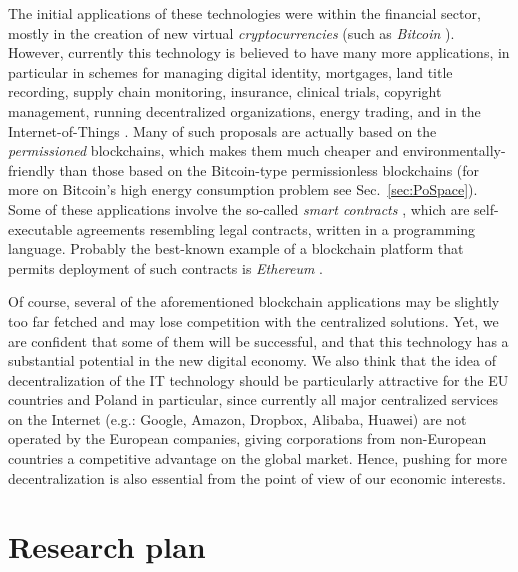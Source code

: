 \documentclass{article}
\begin{document}
The initial applications of these technologies were within the financial sector, mostly in the creation of new virtual \emph{cryptocurrencies} (such as \emph{Bitcoin} \cite{nakamoto2008bitcoin}). However, currently this technology is believed to have many more applications, in particular in schemes for managing digital identity, mortgages, land title recording, supply chain monitoring, insurance, 
clinical trials, copyright management, running decentralized organizations, energy trading, and in the Internet-of-Things \cite{econ3,forbes,econ2,Underwood:2016:BBB:3013530.2994581,EY,ibm,Microsoft5,DHL,chamber,capgemini,pwc,EY,DHL,iot,economist-dao,pwc2}. Many of such proposals are actually based on the \emph{permissioned} blockchains, which makes them much cheaper and environmentally-friendly than those based on the Bitcoin-type permissionless blockchains (for more on Bitcoin's high energy consumption problem see Sec.~\ref{sec:PoSpace}). Some of these applications involve the so-called \emph{smart contracts} \cite{Szabo}, which are self-executable agreements resembling legal contracts, written in a programming language. Probably the best-known example of a blockchain platform that permits deployment of such contracts is \emph{Ethereum} \cite{Ethereum}. 

Of course, several of the aforementioned blockchain applications may be slightly too far fetched and may lose competition with the centralized solutions. Yet, we are confident that some of them will be successful, and that this technology has a substantial potential in the new digital economy. We also think that the idea of decentralization of the IT technology should be particularly attractive for the EU countries and Poland in particular, since currently all major centralized services on the Internet (e.g.: Google, Amazon, Dropbox, Alibaba, Huawei) are not operated by the European companies, giving corporations from non-European countries a competitive advantage on the global market. Hence, pushing for more decentralization is also essential from the point of view of our economic interests.

\section{Research plan}
\end{document}
